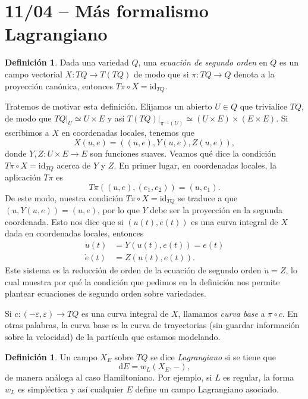 \documentclass[11pt, a4paper]{article}
\newcommand{\id}{\mathrm{id}}
\newcommand{\dd}{\mathrm{d}}
\theoremstyle{plain}
\theoremstyle{definition}
\newtheorem{defn}[prop]{Definición}
\begin{document}
\section{11/04 -- Más formalismo Lagrangiano}

\begin{defn} Dada una variedad $Q$, una \emph{ecuación de segundo orden} en $Q$ es un campo vectorial $X:TQ\to T(TQ)$ de modo que si $\pi:TQ\to Q$ denota a la proyección canónica, entonces $T\pi\circ X = \id_{TQ}$.
\end{defn}

Tratemos de motivar esta definición. Elijamos un abierto $U\in Q$ que trivialice $TQ$, de modo que $TQ|_U \simeq U\times E$ y así $T(TQ)|_{\pi^{-1}(U)} \simeq (U\times E)\times (E\times E)$. Si escribimos a $X$ en coordenadas locales, tenemos que
\[X(u,e) = ((u,e), Y(u,e), Z(u,e)),\]
donde $Y,Z:U\times E\to E$ son funciones suaves. Veamos qué dice la condición $T\pi\circ X = \id_{TQ}$ acerca de $Y$ y $Z$. En primer lugar, en coordenadas locales, la aplicación $T\pi$ es
\[T\pi((u,e),(e_1,e_2)) = (u,e_1).\]
De este modo, nuestra condición $T\pi\circ X = \id_{TQ}$ se traduce a que $(u,Y(u,e))=(u,e)$, por lo que $Y$ debe ser la proyección en la segunda coordenada. Esto nos dice que si $(u(t), e(t))$ es una curva integral de $X$ dada en coordenadas locales, entonces
\begin{align*}
\dot{u}(t)&=Y(u(t),e(t)) = e(t)\\
\dot{e}(t)&=Z(u(t), e(t)).
\end{align*}
Este sistema es la reducción de orden de la ecuación de segundo orden $\ddot{u} = Z$, lo cual muestra por qué la condición que pedimos en la definición nos permite plantear ecuaciones de segundo orden sobre variedades.

Si $c:(-\varepsilon,\varepsilon)\to TQ$ es una curva integral de $X$, llamamos \emph{curva base} a $\pi\circ c$. En otras palabras, la curva base es la curva de trayectorias (sin guardar información sobre la velocidad) de la partícula que estamos modelando.

\begin{defn} Un campo $X_E$ sobre $TQ$ se dice \emph{Lagrangiano} si se tiene que
\[\dd E = w_L(X_E,-),\]
de manera análoga al caso Hamiltoniano. Por ejemplo, si $L$ es regular, la forma $w_L$ es simpléctica y así cualquier $E$ define un campo Lagrangiano asociado.
\end{defn}
\end{document}
